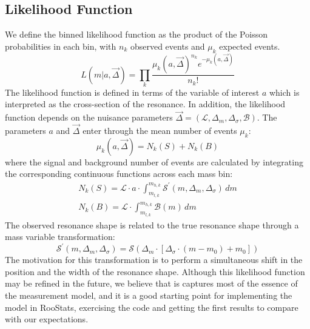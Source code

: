   \subsection{Likelihood Function}
    We define the binned likelihood function as the product of the Poisson probabilities in each bin,
    with $n_k$ observed events and $\mu_k$ expected events.
    \begin{equation}
      L(m|a,\vec{\Delta})=\prod_k{\frac{\mu_k(a,\vec{\Delta})^{n_k}{e^{-\mu_k(a,\vec{\Delta})}}}{n_k!}}
    \end{equation}
    The likelihood function is defined in terms of the variable of interest $a$ which is interpreted as
    the cross-section of the resonance. In addition, the likelihood function depends on the nuisance
    parameters $\vec{\Delta}=(\mathcal{L},\Delta_m,\Delta_\sigma,\mathcal{B})$. The parameters $a$ and $\vec{\Delta}$
    enter through the mean number of events $\mu_k$:
    \begin{equation}
      \mu_k(a,\vec{\Delta})=N_k(S)+N_k(B)
    \end{equation}
    where the signal and background number of events are calculated by integrating the corresponding continuous functions across each mass bin:
    \begin{eqnarray}
      N_k(S) = \mathcal{L}\cdot a\cdot\int_{m_{l,k}}^{m_{h,k}}{\mathcal{S}^\prime(m,\Delta_m,\Delta_\sigma)\,dm}\\
      N_k(B) = \mathcal{L}\cdot\int_{m_{l,k}}^{m_{h,k}}{\mathcal{B}(m)\,dm}  
    \end{eqnarray}
    The observed resonance shape is related to the true resonance shape through a mass variable transformation:
    \begin{equation}
      \mathcal{S}^\prime(m,\Delta_m,\Delta_\sigma) = \mathcal{S}\left(\Delta_m\cdot\left[\Delta_\sigma\cdot\left(m-m_0\right)+m_0\right]\right) 
    \end{equation}
    The motivation for this transformation is to perform a simultaneous shift in the position and the width of the resonance shape. 
    Although this likelihood function may be refined in the future, we believe that is captures most of the essence of the measurement model, and it is a good starting point for implementing the model in RooStats, exercising the code and getting the first results to compare with our expectations.

